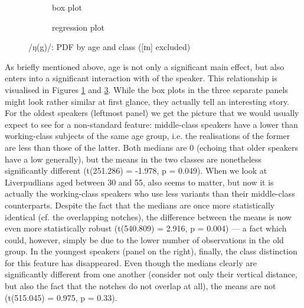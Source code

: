 \begin{figure}[h]
	\centering
	\begin{subfigure}{.49\textwidth}
		\centering
			\resizebox{\linewidth}{!}{} 
		\caption{box plot}
		\label{fig.box.ng.ageclass}
	\end{subfigure}
	\begin{subfigure}{.49\textwidth}
		\centering
			\resizebox{\linewidth}{!}{}
		\caption{regression plot}
		\label{fig.scatter.ng.ageclass}
	\end{subfigure}
	\caption{/ŋ(g)/: PDF by age and class ([ɪn] excluded)}
\end{figure}

As briefly mentioned above, age is not only a significant main effect, but also enters into a significant interaction with  of the speaker.
This relationship is visualised in Figures \ref{fig.box.ng.ageclass} and \ref{fig.scatter.ng.ageclass}.
While the box plots in the three separate panels might look rather similar at first glance, they actually tell an interesting story.
For the oldest speakers (leftmost panel) we get the picture that we would usually expect to see for a non-standard feature: middle-class speakers have a lower  than working-class subjects of the same age group, i.e. the realisations of the former are less  than those of the latter.
Both medians are 0 (echoing that older speakers have a low  generally), but the means in the two classes are nonetheless significantly different (t(251.286) = -1.978, p = 0.049).
When we look at Liverpudlians aged between 30 and 55,  also seems to matter, but now it is actually the working-class speakers who use less  variants than their middle-class counterparts.
Despite the fact that the medians are once more statistically identical (cf. the overlapping notches), the difference between the means is now even more statistically robust (t(540.809) = 2.916, p = 0.004) --- a fact which could, however, simply be due to the lower number of observations in the old group.
In the youngest speakers (panel on the right), finally, the class distinction for this feature has disappeared.
Even though the medians clearly are significantly different from one another (consider not only their vertical distance, but also the fact that the notches do not overlap at all), the means are not (t(515.045) = 0.975, p = 0.33).

